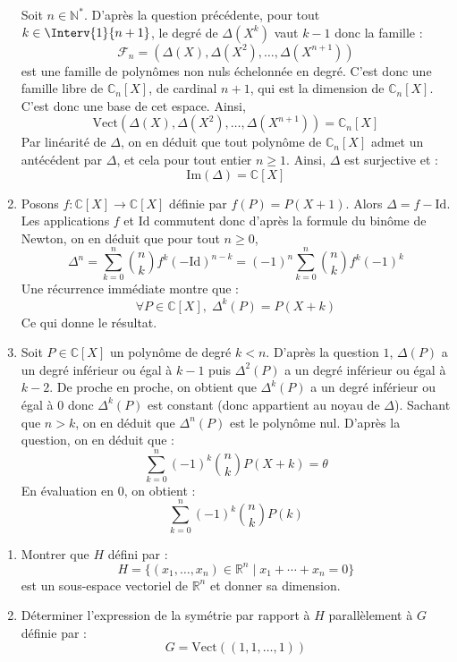\documentclass[a4paper,10pt]{report}
\begin{document}
\begin{enumerate}
\noindent Soit $n \in \mathbb{N}^*$. D'après la question précédente, pour tout $k \in \Interv{1}{n+1}$, le degré de $\Delta(X^k)$ vaut $k-1$ donc la famille :
$$ \mathcal{F}_n = (\Delta(X), \Delta(X^2), \ldots, \Delta(X^{n+1}))$$
 est une famille de polynômes non nuls échelonnée en degré. C'est donc une famille libre de $\mathbb{C}_n[X]$, de cardinal $n+1$, qui est la dimension de $\mathbb{C}_n[X]$. C'est donc une base de cet espace. Ainsi,
 $$ \textrm{Vect}(\Delta(X), \Delta(X^2), \ldots, \Delta(X^{n+1})) = \mathbb{C}_n[X]$$
 Par linéarité de $\Delta$, on en déduit que tout polynôme de $\mathbb{C}_n[X]$ admet un antécédent par $\Delta$, et cela pour tout entier $n \geq 1$. Ainsi, $\Delta$ est surjective et :
 $$ \textrm{Im}(\Delta) = \mathbb{C}[X]$$
 \item Posons $f : \mathbb{C}[X] \rightarrow \mathbb{C}[X]$ définie par $f(P)=P(X+1)$. Alors $\Delta = f - \textrm{Id}$. Les applications $f$ et $\textrm{Id}$ commutent donc d'après la formule du binôme de Newton, on en déduit que pour tout $n \geq 0$,
 $$ \Delta^n = \sum_{k=0}^n \binom{n}{k} f^k (- \textrm{Id})^{n-k}  = (-1)^n \sum_{k=0}^n \binom{n}{k} f^k (-1)^k$$
 Une récurrence immédiate montre que :
 $$ \forall P \in \mathbb{C}[X], \; \Delta^k (P)= P(X+k)$$
 Ce qui donne le résultat.
 \item Soit $P \in \mathbb{C}[X]$ un polynôme de degré $k <n$. D'après la question $1$, $\Delta(P)$ a un degré inférieur ou égal à $k-1$ puis $\Delta^2(P)$ a un degré inférieur ou égal à $k-2$. De proche en proche, on obtient que $\Delta^k(P)$ a un degré inférieur ou égal à $0$ donc $\Delta^k(P)$ est constant (donc appartient au noyau de $\Delta$). Sachant que $n>k$, on en déduit que $\Delta^n(P)$ est le polynôme nul. D'après la question, on en déduit que :
$$\sum_{k = 0}^{n} ( - 1)^{k} \binom{n}{k}P(X + k) = \theta$$
 En évaluation en $0$, on obtient :
 $$ \sum_{k = 0}^{n} ( - 1)^{k} \binom{n}{k}P(k)$$
\end{enumerate}

\begin{Exercice}{} 
\begin{enumerate}
\item Montrer que $H$ défini par :
$$ H = \lbrace (x_1, \ldots, x_n)\in \mathbb{R}^n \; \vert \;    x_1 + \cdots + x_n = 0 \rbrace$$
est un sous-espace vectoriel de $\mathbb{R}^n$ et donner sa dimension.
\item Déterminer l'expression de la symétrie par rapport à $H$ parallèlement à $G$ définie par :
$$ G = \textrm{Vect}((1,1, \ldots, 1))$$
\end{enumerate}
\end{Exercice}
\end{document}
